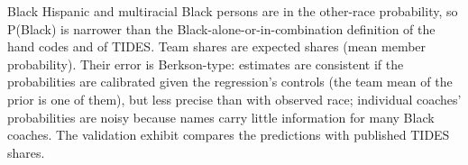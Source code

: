 {Black Hispanic and multiracial Black persons are in the other-race probability, so P(Black) is narrower than the Black-alone-or-in-combination definition of the hand codes and of TIDES. Team shares are expected shares (mean member probability). Their error is Berkson-type: estimates are consistent if the probabilities are calibrated given the regression's controls (the team mean of the prior is one of them), but less precise than with observed race; individual coaches' probabilities are noisy because names carry little information for many Black coaches. The validation exhibit compares the predictions with published TIDES shares.
\par}

